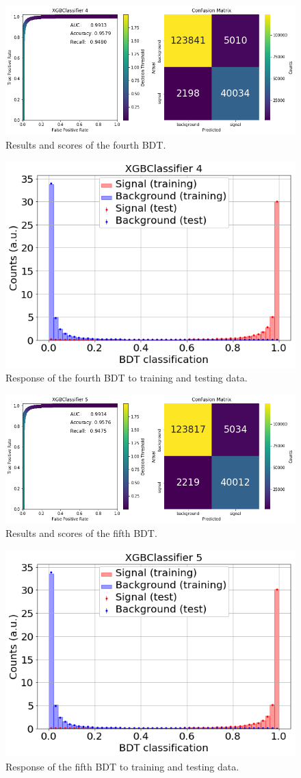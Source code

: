 \begin{figure}[H]
	\centering
	\includegraphics[width=0.8\linewidth]{plots/BDT_4.png}
	\caption{Results and scores of the fourth BDT.}
	\label{fig:BDT_4}
\end{figure}

\begin{figure}[H]
	\centering
	\includegraphics[width=0.5\linewidth]{plots/BDT4_pred.png}
	\caption{Response of the fourth BDT to training and testing data.}
	\label{fig:BDT_4_pred}
\end{figure}

\begin{figure}[H]
	\centering
	\includegraphics[width=0.8\linewidth]{plots/BDT_5.png}
	\caption{Results and scores of the fifth BDT.}
	\label{fig:BDT_5}
\end{figure}

\begin{figure}[H]
	\centering
	\includegraphics[width=0.5\linewidth]{plots/BDT5_pred.png}
	\caption{Response of the fifth BDT to training and testing data.}
	\label{fig:BDT_5_pred}
\end{figure}